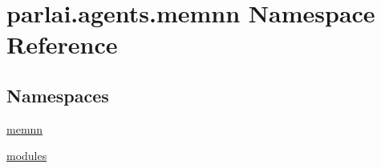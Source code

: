\hypertarget{namespaceparlai_1_1agents_1_1memnn}{}\section{parlai.\+agents.\+memnn Namespace Reference}
\label{namespaceparlai_1_1agents_1_1memnn}
\subsection*{Namespaces}
\begin{DoxyCompactItemize}
\item 
 \hyperlink{namespaceparlai_1_1agents_1_1memnn_1_1memnn}{memnn}
\item 
 \hyperlink{namespaceparlai_1_1agents_1_1memnn_1_1modules}{modules}
\end{DoxyCompactItemize}
